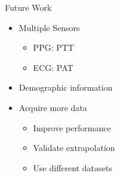 \begin{frame}{Future Work}
    \begin{itemize}
        \item Multiple Sensors
              \begin{itemize}
                  \item PPG: PTT
                  \item ECG: PAT
              \end{itemize}
        \item Demographic information
        \item Acquire more data
              \begin{itemize}
                  \item Improve performance
                  \item Validate extrapolation
                  \item Use different datasets
              \end{itemize}
    \end{itemize}
\end{frame}